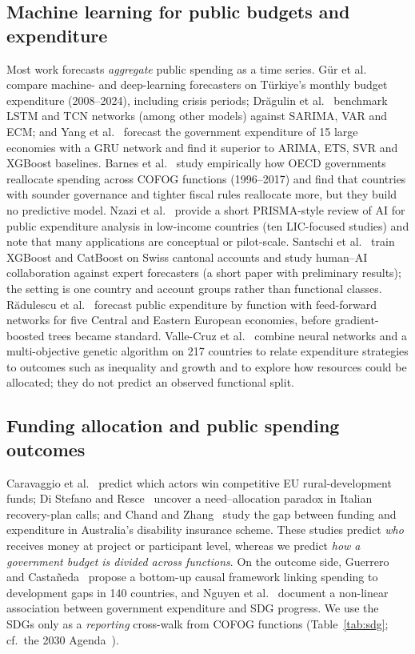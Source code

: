 \subsection{Machine learning for public budgets and expenditure}
Most work forecasts \emph{aggregate} public spending as a time series. G\"ur et al.~\cite{gur2025} compare machine- and deep-learning forecasters on T\"urkiye's monthly budget expenditure (2008--2024), including crisis periods; Dr\u{a}gulin et al.~\cite{dragulin2025} benchmark LSTM and TCN networks (among other models) against SARIMA, VAR and ECM; and Yang et al.~\cite{yang2023} forecast the government expenditure of 15 large economies with a GRU network and find it superior to ARIMA, ETS, SVR and XGBoost baselines. Barnes et al.~\cite{barnes2023} study empirically how OECD governments reallocate spending across COFOG functions (1996--2017) and find that countries with sounder governance and tighter fiscal rules reallocate more, but they build no predictive model. Nzazi et al.~\cite{nzazi2025} provide a short PRISMA-style review of AI for public expenditure analysis in low-income countries (ten LIC-focused studies) and note that many applications are conceptual or pilot-scale. Santschi et al.~\cite{santschi2024} train XGBoost and CatBoost on Swiss cantonal accounts and study human--AI collaboration against expert forecasters (a short paper with preliminary results); the setting is one country and account groups rather than functional classes. R\u{a}dulescu et al.~\cite{radulescu2015} forecast public expenditure by function with feed-forward networks for five Central and Eastern European economies, before gradient-boosted trees became standard. Valle-Cruz et al.~\cite{valle2022} combine neural networks and a multi-objective genetic algorithm on 217 countries to relate expenditure strategies to outcomes such as inequality and growth and to explore how resources could be allocated; they do not predict an observed functional split.

\subsection{Funding allocation and public spending outcomes}
Caravaggio et al.~\cite{caravaggio2025} predict which actors win competitive EU rural-development funds; Di Stefano and Resce~\cite{distefano2025} uncover a need--allocation paradox in Italian recovery-plan calls; and Chand and Zhang~\cite{chand2022} study the gap between funding and expenditure in Australia's disability insurance scheme. These studies predict \emph{who} receives money at project or participant level, whereas we predict \emph{how a government budget is divided across functions}. On the outcome side, Guerrero and Casta\~neda~\cite{guerrero2022} propose a bottom-up causal framework linking spending to development gaps in 140 countries, and Nguyen et al.~\cite{nguyen2026} document a non-linear association between government expenditure and SDG progress. We use the SDGs only as a \emph{reporting} cross-walk from COFOG functions (Table~\ref{tab:sdg}; cf.\ the 2030 Agenda~\cite{un2015agenda}).

